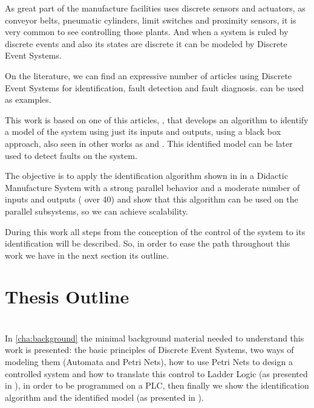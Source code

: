 
As great part of the manufacture facilities uses discrete sensors and actuators,
as conveyor belts, pneumatic cylinders, limit switches and proximity sensors, it
is very common to see \PLCs{} controlling those plants. And when a system is ruled
by discrete events and also its states are discrete it can be modeled by
Discrete Event Systems.

On the literature, we can find an expressive number of articles using Discrete
Event Systems for identification, fault detection and fault diagnosis.
\cite{veras2018distributed,cabral2017synchronous,kumar2014comments,klein2005fault}
can be used as examples.

This work is based on one of this articles, \cite{moreira2018enhanced}, that
develops an algorithm to identify a model of the system using just its inputs
and outputs, using a black box approach, also seen in other works as
\cite{klein2005fault} and \cite{roth2009fdi}. This identified model can be later
used to detect faults on the system.

The objective is to apply the identification algorithm shown in
\cite{moreira2018enhanced} in a Didactic Manufacture System with a strong
parallel behavior and a moderate number of inputs and outputs ( over 40) and
show that this algorithm can be used on the parallel subsystems, so we can
achieve scalability.


During this work all steps from the conception of the control of the system to
its identification will be described. So, in order to ease the path throughout
this work we have in the next section its outline.

\section{Thesis Outline}
\label{sec:thesisOutline}

\paragraph{} ~\\
In \autoref{cha:background} the minimal background material needed to understand
this work is presented: the basic principles of Discrete Event Systems, two
ways of modeling them (Automata and Petri Nets), how to use Petri Nets to design
a controlled system and how to translate this control to Ladder Logic (as
presented in \cite{moreira2013bridging}), in order to be programmed on a PLC,
then finally we show the identification algorithm and the identified model
\DAOCT{} (as presented in \cite{moreira2018enhanced}).

